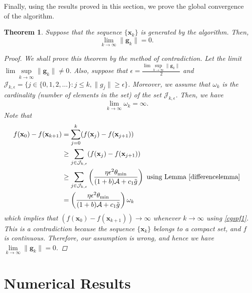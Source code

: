 \documentclass{elsarticle}
\newtheorem{theorem}{Theorem}
\numberwithin{equation}{section}
\begin{document}
{Finally, using the results proved in this section, we prove the global convergence of the algorithm.
\allowdisplaybreaks
\begin{theorem}
    Suppose that the sequence $\{\mathbf{x}_{k}\}$ is generated by the algorithm. Then, 
    \begin{equation*}
        \lim\limits_{k\to\infty}\lVert \mathbf{g}_k\rVert =0.
    \end{equation*}
    \begin{proof}
        We shall prove this theorem by the method of contradiction. Let the limit
        $\lim\sup\limits_{k\to\infty}\lVert \mathbf{g}_k\rVert\neq0$. Also, suppose that $\epsilon=\frac{\lim\sup\limits_{k\to\infty}\lVert \mathbf{g}_k\rVert}{2}$ and $\mathcal{J}_{k,\epsilon}=\{j\in\{0,1,2,\ldots\} : j\leq k, \lVert g_{j}\rVert \geq\epsilon\}$. Moreover, we assume that $\omega_{k}$ is the cardinality (number of elements in the set) of the set $\mathcal{J}_{k,\epsilon}$. Then, we have 
        \begin{equation}\label{cgspf1}
            \lim\limits_{k\to\infty}\omega_k=\infty.
        \end{equation}
        Note that
        \begin{align*}
            f(\mathbf{x}_{0})-f(\mathbf{x}_{k+1})&=\sum\limits_{j=0}^{k}(f(\mathbf{x}_{j})-f(\mathbf{x}_{j+1}))\\
            &\geq \sum\limits_{j\in\mathcal{J}_{k,\epsilon}}(f(\mathbf{x}_{j})-f(\mathbf{x}_{j+1}))\\
            &\geq \sum\limits_{j\in\mathcal{J}_{k,\epsilon}} \left(\frac{\eta\epsilon^{2}\theta_{\min}}{(1+b)\mathcal{A}+c_1\tilde{g}}\right) \text{ using Lemma }\ref{differencelemma}\\
            &= \left(\frac{\eta\epsilon^{2}\theta_{\min}}{(1+b)\mathcal{A}+c_1\tilde{g}}\right) \omega_{k}
        \end{align*}
        which implies that $(f(\mathbf{x}_{0})-f(\mathbf{x}_{k+1}))\rightarrow\infty$ whenever $k\rightarrow\infty$ using \eqref{cgspf1}. This is a contradiction because the sequence $\{\mathbf{x}_{k}\}$ belongs to a compact set, and $f$ is continuous. Therefore, our assumption is wrong, and hence we have $\lim\limits_{k\to\infty}\lVert \mathbf{g}_k\rVert=0$.
    \end{proof}
\end{theorem}
}





\section{Numerical Results}
\end{document}
